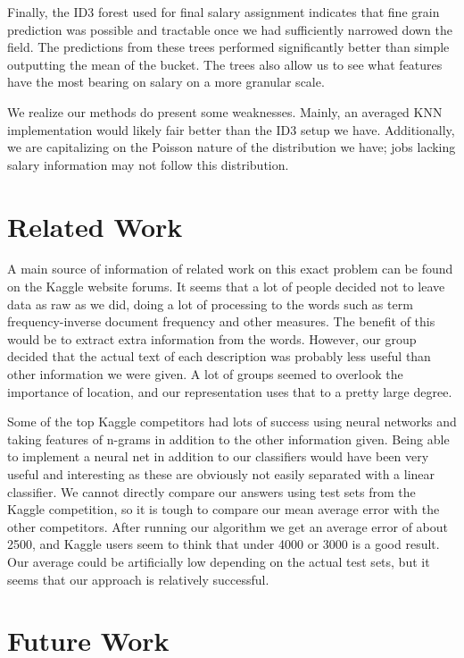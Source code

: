 \documentclass{pset}
\begin{document}
Finally, the ID3 forest used for final salary assignment indicates that fine
grain prediction was possible and tractable once we had sufficiently narrowed
down the field. The predictions from these trees performed significantly better
than simple outputting the mean of the bucket. The trees also allow us to see
what features have the most bearing on salary on a more granular scale. 

We realize our methods do present some weaknesses. Mainly, an averaged KNN
implementation would likely fair better than the ID3 setup we have.
Additionally, we are capitalizing on the Poisson nature of the distribution we
have; jobs lacking salary information may not follow this distribution.  

\section{Related Work}

A main source of information of related work on this exact problem can be found
on the Kaggle website forums. It seems that a lot of people decided not to
leave data as raw as we did, doing a lot of processing to the words such as
term frequency-inverse document frequency and other measures. The benefit of
this would be to extract extra information from the words.
However, our group decided that the actual text of
each description was probably less useful than other information we were given.
A lot of groups seemed to overlook the importance of location, and our
representation uses that to a pretty large degree. 

Some of the top Kaggle competitors had lots of success using neural networks
and taking features of n-grams in addition to the other information given.
Being able to implement a neural net in addition to our classifiers would have
been very useful and interesting as these are obviously not easily separated
with a linear classifier. We cannot directly compare our answers using test
sets from the Kaggle competition, so it is tough to compare our mean average
error with the other competitors. After running our algorithm we get an average
error of about 2500, and Kaggle users seem to think that under 4000 or 3000 is
a good result. Our average could be artificially low depending on the actual
test sets, but it seems that our approach is relatively successful.

\section{Future Work}
\end{document}

